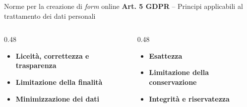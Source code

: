 \documentclass[aspectratio=169]{beamer}
\begin{document}
\begin{frame}{Norme per la creazione di \emph{form} online}
  \textbf{Art. 5 GDPR} -- Principi applicabili al trattamento dei dati personali

  \vspace{0.2cm}
  \begin{columns}[T]
    \begin{column}{0.48\textwidth}
      \begin{itemize}
        \item[a)] \textbf{Liceità, correttezza e trasparenza}
        \item[b)] \textbf{Limitazione della finalità}
        \item[c)] \textbf{Minimizzazione dei dati}
      \end{itemize}
    \end{column}
    \begin{column}{0.48\textwidth}
      \begin{itemize}
        \item[d)] \textbf{Esattezza}
        \item[e)] \textbf{Limitazione della conservazione}
        \item[f)] \textbf{Integrità e riservatezza}
      \end{itemize}
    \end{column}
  \end{columns}
\end{frame}
\end{document}
